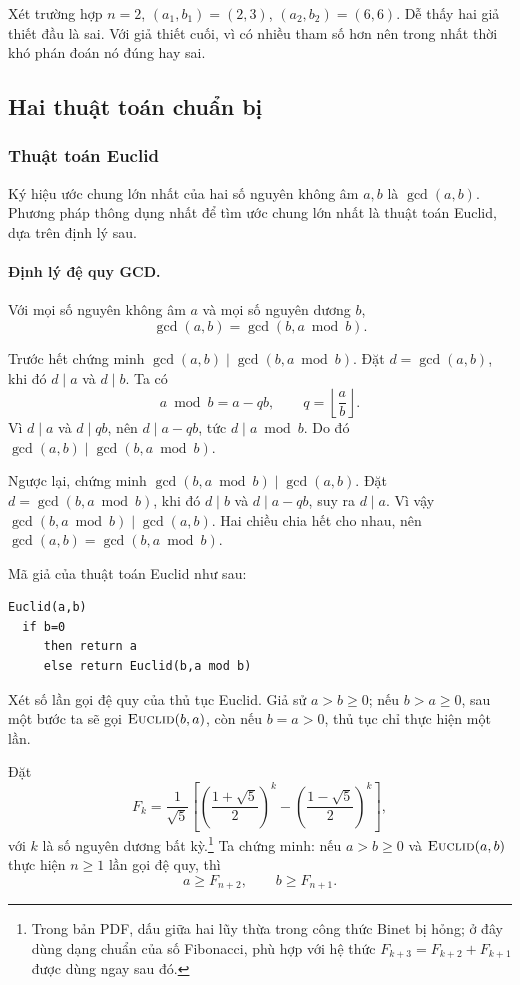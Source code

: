 \documentclass[11pt]{article}
\begin{document}
Xét trường hợp \(n=2\), \((a_1,b_1)=(2,3)\), \((a_2,b_2)=(6,6)\). Dễ thấy hai
giả thiết đầu là sai. Với giả thiết cuối, vì có nhiều tham số hơn nên trong
nhất thời khó phán đoán nó đúng hay sai.

\subsection{Hai thuật toán chuẩn bị}

\subsubsection{Thuật toán Euclid}

Ký hiệu ước chung lớn nhất của hai số nguyên không âm \(a,b\) là
\(\gcd(a,b)\). Phương pháp thông dụng nhất để tìm ước chung lớn nhất là thuật
toán Euclid, dựa trên định lý sau.

\paragraph{Định lý đệ quy GCD.}
Với mọi số nguyên không âm \(a\) và mọi số nguyên dương \(b\),
\[
  \gcd(a,b)=\gcd(b,a\bmod b).
\]

Trước hết chứng minh \(\gcd(a,b)\mid \gcd(b,a\bmod b)\). Đặt
\(d=\gcd(a,b)\), khi đó \(d\mid a\) và \(d\mid b\). Ta có
\[
  a\bmod b = a-qb,\qquad q=\left\lfloor\frac ab\right\rfloor.
\]
Vì \(d\mid a\) và \(d\mid qb\), nên \(d\mid a-qb\), tức
\(d\mid a\bmod b\). Do đó \(\gcd(a,b)\mid \gcd(b,a\bmod b)\).

Ngược lại, chứng minh \(\gcd(b,a\bmod b)\mid \gcd(a,b)\). Đặt
\(d=\gcd(b,a\bmod b)\), khi đó \(d\mid b\) và \(d\mid a-qb\), suy ra
\(d\mid a\). Vì vậy \(\gcd(b,a\bmod b)\mid \gcd(a,b)\). Hai chiều chia hết cho
nhau, nên \(\gcd(a,b)=\gcd(b,a\bmod b)\).

Mã giả của thuật toán Euclid như sau:
\begin{verbatim}
Euclid(a,b)
  if b=0
     then return a
     else return Euclid(b,a mod b)
\end{verbatim}

Xét số lần gọi đệ quy của thủ tục Euclid. Giả sử \(a>b\ge 0\); nếu
\(b>a\ge 0\), sau một bước ta sẽ gọi \(\textsc{Euclid}(b,a)\), còn nếu
\(b=a>0\), thủ tục chỉ thực hiện một lần.

Đặt
\[
  F_k=\frac1{\sqrt5}\left[
    \left(\frac{1+\sqrt5}{2}\right)^k
    -
    \left(\frac{1-\sqrt5}{2}\right)^k
  \right],
\]
với \(k\) là số nguyên dương bất kỳ.\footnote{Trong bản PDF,
dấu giữa hai lũy thừa trong công thức Binet bị hỏng; ở đây dùng dạng chuẩn của
số Fibonacci, phù hợp với hệ thức \(F_{k+3}=F_{k+2}+F_{k+1}\) được dùng ngay
sau đó.}
Ta chứng minh: nếu \(a>b\ge 0\) và \(\textsc{Euclid}(a,b)\) thực hiện
\(n\ge 1\) lần gọi đệ quy, thì
\[
  a\ge F_{n+2},\qquad b\ge F_{n+1}.
\]
\end{document}
